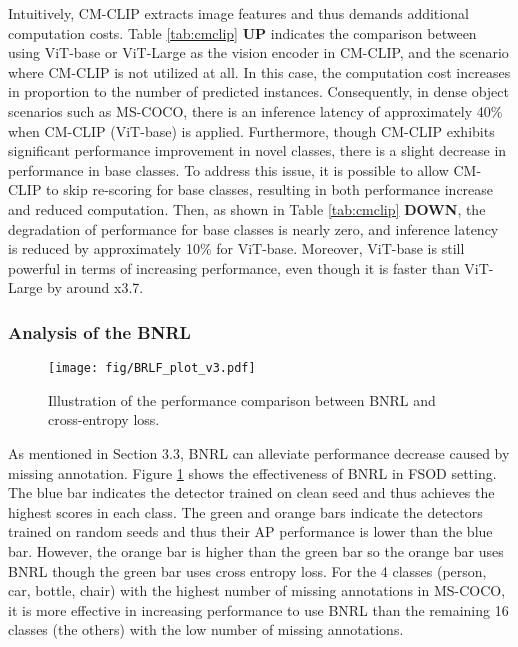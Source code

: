 \documentclass{article}
\begin{document}
Intuitively, CM-CLIP extracts image features and thus demands additional computation costs.
Table \ref{tab:cmclip} {\bf UP} indicates the comparison between using ViT-base or ViT-Large as the vision encoder in CM-CLIP, and the scenario where CM-CLIP is not utilized at all.
In this case, the computation cost increases in proportion to the number of predicted instances. 
Consequently, in dense object scenarios such as MS-COCO, there is an inference latency of approximately 40\% when CM-CLIP (ViT-base) is applied.
Furthermore, though CM-CLIP exhibits significant performance improvement in novel classes, there is a slight decrease in performance in base classes.
To address this issue, it is possible to allow CM-CLIP to skip re-scoring for base classes, resulting in both performance increase and reduced computation.
Then, as shown in Table \ref{tab:cmclip} {\bf DOWN}, the degradation of performance for base classes is nearly zero, and inference latency is reduced by approximately 10\% for ViT-base.
Moreover, ViT-base is still powerful in terms of increasing performance, even though it is faster than ViT-Large by around x3.7.

\subsubsection{Analysis of the BNRL}

\begin{figure}[h]
\centering
\texttt{[image: fig/BRLF\_plot\_v3.pdf]} 
\caption{Illustration of the performance comparison between BNRL and cross-entropy loss. }
\label{fig:wrapfig}
\end{figure}
As mentioned in Section 3.3, BNRL can alleviate performance decrease caused by missing annotation.
Figure \ref{fig:wrapfig} shows the effectiveness of BNRL in FSOD setting.
The blue bar indicates the detector trained on clean seed and thus achieves the highest scores in each class. 
The green and orange bars indicate the detectors trained on random seeds and thus their AP performance is lower than the blue bar.
However, the orange bar is higher than the green bar so the orange bar uses BNRL though the green bar uses cross entropy loss.
For the 4 classes (person, car, bottle, chair) with the highest number of missing annotations in MS-COCO, it is more effective in increasing performance to use BNRL than the remaining 16 classes (the others) with the low number of missing annotations.
\end{document}
